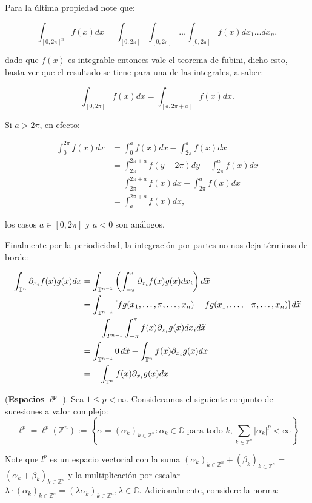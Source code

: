 \documentclass[12pt]{article}
\newcommand\Z{\ensuremath{\mathbb{Z}}}
\newcommand\T{\mathbb{T}}
\begin{document}
Para la última propiedad note que:

$$\int_{[0,2\pi]^ n}f(x)dx=\int_{[0,2\pi]}\int_{[0,2\pi]}\ldots\int_{[0,2\pi]}f(x) dx_1\ldots dx_n,$$

dado que $f(x)$ es integrable entonces vale el teorema de fubini, dicho esto, basta ver que el resultado se tiene para una de las integrales, a saber:

$$\int_{[0,2\pi]}f(x)dx=\int_{[a,2\pi+a]}f(x)dx.$$

Si $a>2\pi$, en efecto:

\begin{align*}
    \int_0^{2\pi}f(x)dx&=\int_0^af(x)dx-\int_{2\pi}^af(x) dx\\
    &=\int_{2\pi}^{2\pi+a}f(y-2\pi)dy-\int_{2\pi}^af(x)dx\\
    &=\int_{2\pi}^{2\pi+a}f(x)dx-\int_{2\pi}^af(x)dx\\
    &=\int_a^{2\pi+a}f(x)dx
,\end{align*}

los casos $a\in [0,2\pi]$ y $a<0$ son análogos.

Finalmente por la periodicidad, la integración por partes no nos deja términos de borde:

    \begin{align*}
        \int_{\mathbb{T}^n} \partial_{x_i} f(x) g(x) d x&=\int_{\T ^{n-1}}\left(\int_{-\pi}^{\pi}\partial_{x_i} f(x) g(x)dx_{i}\right)d\widetilde{x}\\
        &=\int_{\T^{n-1}}\left[fg(x_1,\ldots,\pi,\ldots,x_n)-fg(x_1,\ldots,-\pi,\ldots,x_n)\right]d\widetilde{x}\\
        &\hspace*{0.4cm}-\int_{T^{n-1}}\int_{-\pi}^{\pi}f(x)\partial_{x_i}g(x)dx_id\widetilde{x}\\
        &=\int_{\T^{n-1}}0\,d\widetilde{x}-\int_{\T^n}f(x)\partial_{x_i}g(x)dx\\
        &=-\int_{\T^n}f(x)\partial_{x_i}g(x)dx
    \end{align*}

(\textbf{Espacios} $\mathbf{\ell^p}$ ). Sea $1 \leq p<\infty$. Consideramos el siguiente conjunto de sucesiones  a valor complejo:
$$
\ell^p=\ell^p(\mathbb{Z}^n):=\left\{\alpha=\left(\alpha_k\right)_{k \in \mathbb{Z}^n}: \alpha_k \in \mathbb{C} \text { para todo } k, \sum_{k\in \Z^n}\left|\alpha_k\right|^p<\infty\right\}
$$


Note que $l^p$ es un espacio vectorial con la suma $\left(\alpha_k\right)_{k \in \mathbb{Z}^n}+\left(\beta_k\right)_{k \in \mathbb{Z}^n}=$ $\left(\alpha_k+\beta_k\right)_{k \in \mathbb{Z}^n}$ y la multiplicación por escalar $\lambda \cdot\left(\alpha_k\right)_{k \in \mathbb{Z}^n}=\left(\lambda \alpha_k\right)_{k \in \mathbb{Z}^n}, \lambda \in \mathbb{C}$. Adicionalmente, considere la norma:
\end{document}
